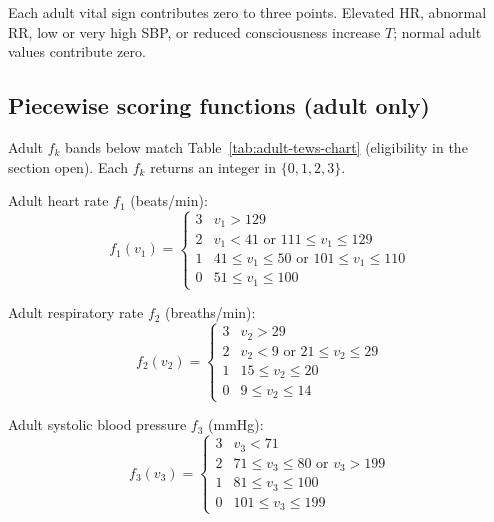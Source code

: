 \begin{remark}
Each adult vital sign contributes zero to three points. Elevated HR, abnormal RR, low or very high SBP, or reduced consciousness increase \(T\); normal adult values contribute zero.
\end{remark}

\subsection{Piecewise scoring functions (adult only)}

Adult \(f_k\) bands below match Table~\ref{tab:adult-tews-chart} (eligibility in the section open). Each \(f_k\) returns an integer in \(\{0,1,2,3\}\).

Adult heart rate \(f_1\) (beats/min):
\begin{equation}
  f_1(v_{1}) = \begin{cases}
    3 & v_{1} > 129 \\
    2 & v_{1} < 41 \text{ or } 111 \leq v_{1} \leq 129 \\
    1 & 41 \leq v_{1} \leq 50 \text{ or } 101 \leq v_{1} \leq 110 \\
    0 & 51 \leq v_{1} \leq 100
  \end{cases}
\end{equation}

Adult respiratory rate \(f_2\) (breaths/min):
\begin{equation}
  f_2(v_{2}) = \begin{cases}
    3 & v_{2} > 29 \\
    2 & v_{2} < 9 \text{ or } 21 \leq v_{2} \leq 29 \\
    1 & 15 \leq v_{2} \leq 20 \\
    0 & 9 \leq v_{2} \leq 14
  \end{cases}
\end{equation}

Adult systolic blood pressure \(f_3\) (mmHg):
\begin{equation}
  f_3(v_{3}) = \begin{cases}
    3 & v_{3} < 71 \\
    2 & 71 \leq v_{3} \leq 80 \text{ or } v_{3} > 199 \\
    1 & 81 \leq v_{3} \leq 100 \\
    0 & 101 \leq v_{3} \leq 199
  \end{cases}
\end{equation}

